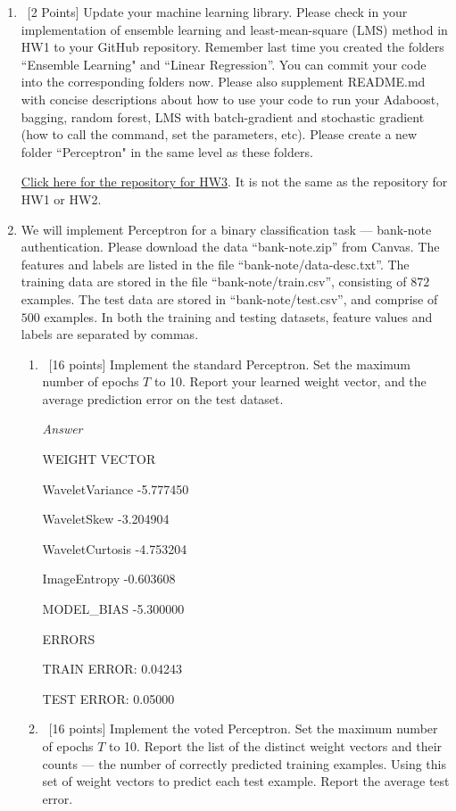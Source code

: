 \documentclass[12pt, fullpage,letterpaper]{article}
\begin{document}
\begin{enumerate}
	\item~[2 Points] Update your machine learning library. Please check in your implementation of ensemble learning and least-mean-square (LMS) method in HW1 to your GitHub repository. Remember last time you created the folders ``Ensemble Learning" and ``Linear Regression''. You can commit your code into the corresponding folders now. Please also supplement README.md with concise descriptions about how to use your code to run your Adaboost, bagging, random forest, LMS with batch-gradient and stochastic gradient (how to call the command, set the parameters, etc). Please create a new folder ``Perceptron" in the same level as these folders.
	
	\href{https://github.com/Paul-Wissler/cs-6350-hw3}{Click here for the repository for HW3}. It is not the same as the repository for HW1 or HW2.

\item We will implement  Perceptron for a binary classification task --- bank-note authentication. Please download the data ``bank-note.zip'' from Canvas. The features and labels are listed in the file ``bank-note/data-desc.txt''. The training data are stored in the file ``bank-note/train.csv'', consisting of $872$ examples. The test data are stored in ``bank-note/test.csv'', and comprise of $500$ examples. In both the training and testing datasets, feature values and labels are separated by commas. 
\begin{enumerate}
	\item~[16 points] Implement the standard Perceptron. Set the maximum number of epochs $T$ to 10. Report your learned weight vector, and the average prediction error on the test dataset. 
	
	\emph{Answer}
	
	WEIGHT VECTOR
	
	WaveletVariance   -5.777450
	
    WaveletSkew       -3.204904
    
    WaveletCurtosis   -4.753204
    
    ImageEntropy      -0.603608
    
    MODEL\_BIAS        -5.300000
    
    ERRORS
	
	TRAIN ERROR:  0.04243
	
    TEST ERROR:   0.05000
	
	\item~[16 points] Implement the voted Perceptron. Set the maximum number of epochs $T$ to 10. Report the list of the distinct weight vectors and their counts --- the number of correctly predicted training examples. Using this set of weight vectors to predict each test example. Report the average test error. 
	

\end{enumerate}
\end{enumerate}
\end{document}
